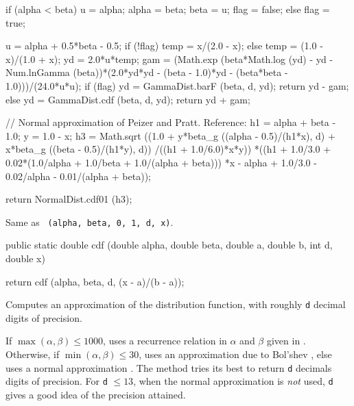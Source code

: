 \begin{code}
\begin{hide}
{{         if (alpha < beta) {
            u = alpha;
            alpha = beta;
            beta = u;
            flag = false;
         }
         else
            flag = true;

         u = alpha + 0.5*beta - 0.5;
         if (!flag)
            temp = x/(2.0 - x);
         else
            temp = (1.0 - x)/(1.0 + x);
         yd = 2.0*u*temp;
         gam = (Math.exp (beta*Math.log (yd) - yd -
                  Num.lnGamma (beta))*(2.0*yd*yd - (beta -
                  1.0)*yd - (beta*beta - 1.0)))/(24.0*u*u);
         if (flag) {
            yd = GammaDist.barF (beta, d, yd);
            return yd - gam;
         } else {
            yd = GammaDist.cdf (beta, d, yd);
            return yd + gam;
         }
      }

      // Normal approximation of Peizer and Pratt.   Reference: \cite{tPEI68a}
      h1 = alpha + beta - 1.0;
      y = 1.0 - x;
      h3 = Math.sqrt ((1.0 + y*beta_g ((alpha - 0.5)/(h1*x), d)
            + x*beta_g ((beta - 0.5)/(h1*y), d))
         /((h1 + 1.0/6.0)*x*y))
         *((h1 + 1.0/3.0 + 0.02*(1.0/alpha + 1.0/beta + 1.0/(alpha + beta)))
         *x - alpha + 1.0/3.0 - 0.02/alpha - 0.01/(alpha + beta));

      return NormalDist.cdf01 (h3);
   }\end{hide}
\end{code}
\begin{tabb}  Same as
~\texttt{(alpha, beta, 0, 1, d, x)}.
\end{tabb}
\begin{code}

   public static double cdf (double alpha, double beta,
                             double a, double b, int d, double x)\begin{hide} {
      return cdf (alpha, beta, d, (x - a)/(b - a));
   }\end{hide}
\end{code}
  \begin{tabb}
  Computes an approximation of the distribution function, with roughly
  \texttt{d} decimal digits of precision. \begin{detailed} If
   $\max (\alpha, \beta) \le 1000$, uses a recurrence relation
  in $\alpha$ and $\beta$ %
  given in \cite{tGAU64a,tGAU64b}.
  Otherwise, if $\min (\alpha, \beta) \le 30$,
  uses an approximation due to Bol'shev \cite{tMAR78a},
  else uses a normal approximation \cite{tPEI68a}.
  The method tries its best to return \texttt{d} decimals digits of precision.
  For \texttt{d} $\le 13$, when the normal approximation is {\em not\/} used,
  \texttt{d} gives a good idea of the precision attained.
\end{detailed}
  \end{tabb}
